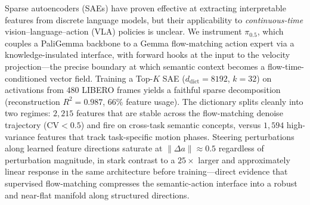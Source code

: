 Sparse autoencoders (SAEs) have proven effective at extracting interpretable
features from discrete language models, but their applicability to
\emph{continuous-time} vision--language--action (VLA) policies is unclear.
We instrument $\pi_{0.5}$, which couples a PaliGemma backbone to a Gemma flow-matching
action expert via a knowledge-insulated interface, with forward hooks at the input
to the velocity projection---the precise boundary at which semantic context becomes
a flow-time-conditioned vector field. Training a Top-$K$ SAE
($d_\text{dict}{=}8192$, $k{=}32$) on activations from $480$ LIBERO frames yields
a faithful sparse decomposition (reconstruction $R^2{=}0.987$, $66\%$ feature usage).
The dictionary splits cleanly into two regimes: $2{,}215$ features
that are stable across the flow-matching denoise trajectory (CV${<}0.5$) and fire
on cross-task semantic concepts, versus $1{,}594$ high-variance features
that track task-specific motion phases. Steering perturbations along learned
feature directions saturate at $\|\Delta a\|{\approx}0.5$ regardless of perturbation
magnitude, in stark contrast to a $25{\times}$ larger and approximately linear response in
the same architecture before training---direct evidence that supervised
flow-matching compresses the semantic-action interface into a robust and
near-flat manifold along structured directions.
